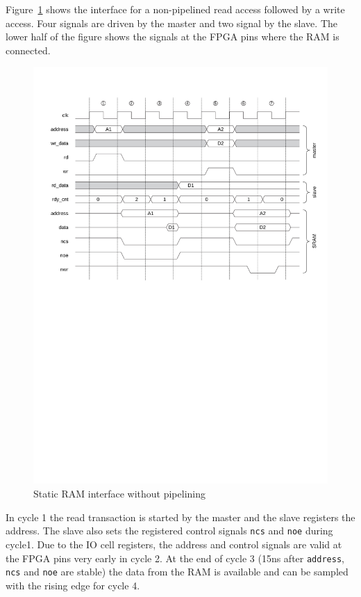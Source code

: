 \documentclass[a4paper,12pt]{scrartcl}
\newcommand{\sign}[1]{{\texttt{#1}}}
\begin{document}
Figure~\ref{fig:sc:sram} shows the interface for a non-pipelined
read access followed by a write access. Four signals are driven by
the master and two signal by the slave. The lower half of the figure
shows the signals at the FPGA pins where the RAM is connected.

\begin{figure}
    \centering
    \includegraphics[width=\textwidth]{figures/sc_sram}
    \caption{Static RAM interface without pipelining}
    \label{fig:sc:sram}
\end{figure}

In cycle 1 the read transaction is started by the master and the
slave registers the address. The slave also sets the registered
control signals \sign{ncs} and \sign{noe} during cycle1. Due to the
IO cell registers, the address and control signals are valid at the
FPGA pins very early in cycle 2. At the end of cycle 3 (15ns after
\sign{address}, \sign{ncs} and \sign{noe} are stable) the data from
the RAM is available and can be sampled with the rising edge for
cycle 4.
\end{document}
